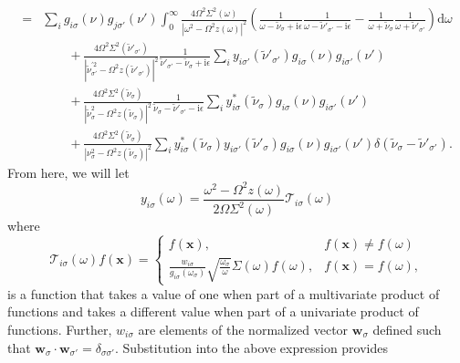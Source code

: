 \begin{equation}
\begin{split}
= &\sum_ig_{i\sigma}(\nu)g_{j\sigma'}(\nu')\int_0^\infty\frac{4\Omega^2\Sigma^2(\omega)}{|\omega^2 - \Omega^2z(\omega)|^2}\left(\frac{1}{\omega - \tilde{\nu}_\sigma + \mathrm{i}\epsilon}\frac{1}{\omega - \tilde{\nu}'_{\sigma'} - \mathrm{i}\epsilon} - \frac{1}{\omega + \tilde{\nu}_\sigma}\frac{1}{\omega + \tilde{\nu}'_{\sigma'}}\right)\mathrm{d}\omega\\
&\qquad + \frac{4\Omega^2\Sigma^2(\tilde{\nu}'_{\sigma'})}{|\tilde{\nu}_{\sigma'}^{\prime2} - \Omega^2z(\tilde{\nu}'_{\sigma'})|^2}\frac{1}{\tilde{\nu}'_{\sigma'} - \tilde{\nu}_\sigma + \mathrm{i}\epsilon}\sum_{i}y_{i\sigma'}(\tilde{\nu}'_{\sigma'})g_{i\sigma}(\nu)g_{i\sigma'}(\nu')\\
&\qquad + \frac{4\Omega^2\Sigma^2(\tilde{\nu}_\sigma)}{|\tilde{\nu}_\sigma^2 - \Omega^2z(\tilde{\nu}_\sigma)|^2}\frac{1}{\tilde{\nu}_\sigma - \tilde{\nu}'_{\sigma'} - \mathrm{i}\epsilon}\sum_{i}y_{i\sigma}^*(\tilde{\nu}_\sigma)g_{i\sigma}(\nu)g_{i\sigma'}(\nu')\\
&\qquad + \frac{4\Omega^2\Sigma^2(\tilde{\nu}_\sigma)}{|\nu_\sigma^2 - \Omega^2z(\tilde{\nu}_\sigma)|^2}\sum_{i}y^*_{i\sigma}(\tilde{\nu}_\sigma)y_{i\sigma'}(\tilde{\nu}'_\sigma)g_{i\sigma}(\nu)g_{i\sigma'}(\nu')\delta(\tilde{\nu}_\sigma - \tilde{\nu}'_{\sigma'}).
\end{split}
\end{equation}
From here, we will let
\begin{equation}
y_{i\sigma}(\omega) = \frac{\omega^2 - \Omega^2z(\omega)}{2\Omega\Sigma^2(\omega)}\mathcal{T}_{i\sigma}(\omega)
\end{equation}
where
\begin{equation}
\mathcal{T}_{i\sigma}(\omega)f(\mathbf{x}) = 
\begin{cases}
f(\mathbf{x}), & f(\mathbf{x})\neq f(\omega)\\
\frac{w_{i\sigma}}{g_{i\sigma}(\omega_\sigma)}\sqrt{\frac{\omega_\sigma}{\omega}}\Sigma(\omega)f(\omega), & f(\mathbf{x}) = f(\omega),
\end{cases}
\end{equation}
is a function that takes a value of one when part of a multivariate product of functions and takes a different value when part of a univariate product of functions. Further, $w_{i\sigma}$ are elements of the normalized vector $\mathbf{w}_\sigma$ defined such that $\mathbf{w}_\sigma\cdot\mathbf{w}_{\sigma'} = \delta_{\sigma\sigma'}$. Substitution into the above expression provides
